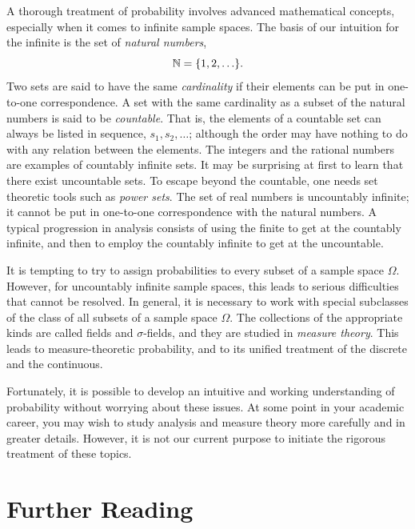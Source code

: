 A thorough treatment of probability involves advanced mathematical concepts, especially when it comes to infinite sample spaces.
The basis of our intuition for the infinite is the set of \emph{natural numbers},
\begin{equation*}
\mathbb{N} = \{ 1, 2, \ldots \}.
\end{equation*}
Two sets are said to have the same \emph{cardinality} if their elements can be put in one-to-one correspondence.
A set with the same cardinality as a subset of the natural numbers is said to be \emph{countable}.
That is, the elements of a countable set can always be listed in sequence, $s_1, s_2, \ldots$; although the order may have nothing to do with any relation between the elements.
The integers and the rational numbers are examples of countably infinite sets.
It may be surprising at first to learn that there exist uncountable sets.
To escape beyond the countable, one needs set theoretic tools such as \emph{power sets}.
The set of real numbers is uncountably infinite; it cannot be put in one-to-one correspondence with the natural numbers.
A typical progression in analysis consists of using the finite to get at the countably infinite, and then to employ the countably infinite to get at the uncountable.

It is tempting to try to assign probabilities to every subset of a sample space $\Omega$.
However, for uncountably infinite sample spaces, this leads to serious difficulties that cannot be resolved.
In general, it is necessary to work with special subclasses of the class of all subsets of a sample space $\Omega$.
The collections of the appropriate kinds are called fields and $\sigma$-fields, and they are studied in \emph{measure theory}.
This leads to measure-theoretic probability, and to its unified treatment of the discrete and the continuous.

Fortunately, it is possible to develop an intuitive and working understanding of probability without worrying about these issues.
At some point in your academic career, you may wish to study analysis and measure theory more carefully and in greater details.
However, it is not our current purpose to initiate the rigorous treatment of these topics.


\section*{Further Reading}

